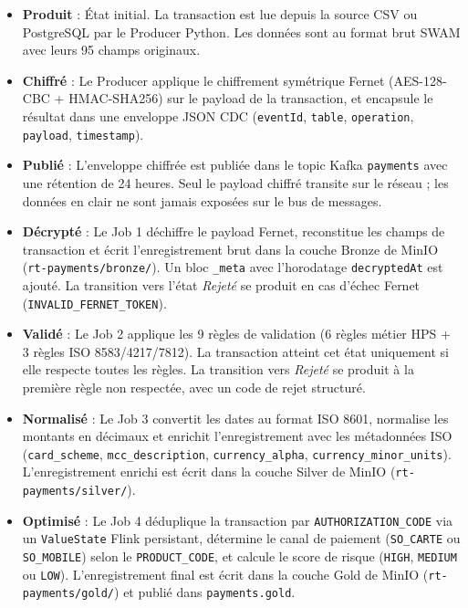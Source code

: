 \begin{itemize}[leftmargin=1.5cm]
    \item \textbf{Produit} : État initial. La transaction est lue depuis la source CSV ou PostgreSQL par le Producer Python. Les données sont au format brut SWAM avec leurs 95 champs originaux.

    \item \textbf{Chiffré} : Le Producer applique le chiffrement symétrique Fernet (AES-128-CBC + HMAC-SHA256) sur le payload de la transaction, et encapsule le résultat dans une enveloppe JSON CDC (\texttt{eventId}, \texttt{table}, \texttt{operation}, \texttt{payload}, \texttt{timestamp}).

    \item \textbf{Publié} : L'enveloppe chiffrée est publiée dans le topic Kafka \texttt{payments} avec une rétention de 24 heures. Seul le payload chiffré transite sur le réseau ; les données en clair ne sont jamais exposées sur le bus de messages.

    \item \textbf{Décrypté} : Le Job 1 déchiffre le payload Fernet, reconstitue les champs de transaction et écrit l'enregistrement brut dans la couche Bronze de MinIO (\texttt{rt-payments/bronze/}). Un bloc \texttt{\_meta} avec l'horodatage \texttt{decryptedAt} est ajouté. La transition vers l'état \textit{Rejeté} se produit en cas d'échec Fernet (\texttt{INVALID\_FERNET\_TOKEN}).

    \item \textbf{Validé} : Le Job 2 applique les 9 règles de validation (6 règles métier HPS + 3 règles ISO 8583/4217/7812). La transaction atteint cet état uniquement si elle respecte toutes les règles. La transition vers \textit{Rejeté} se produit à la première règle non respectée, avec un code de rejet structuré.

    \item \textbf{Normalisé} : Le Job 3 convertit les dates au format ISO 8601, normalise les montants en décimaux et enrichit l'enregistrement avec les métadonnées ISO (\texttt{card\_scheme}, \texttt{mcc\_description}, \texttt{currency\_alpha}, \texttt{currency\_minor\_units}). L'enregistrement enrichi est écrit dans la couche Silver de MinIO (\texttt{rt-payments/silver/}).

    \item \textbf{Optimisé} : Le Job 4 déduplique la transaction par \texttt{AUTHORIZATION\_CODE} via un \texttt{ValueState} Flink persistant, détermine le canal de paiement (\texttt{SO\_CARTE} ou \texttt{SO\_MOBILE}) selon le \texttt{PRODUCT\_CODE}, et calcule le score de risque (\texttt{HIGH}, \texttt{MEDIUM} ou \texttt{LOW}). L'enregistrement final est écrit dans la couche Gold de MinIO (\texttt{rt-payments/gold/}) et publié dans \texttt{payments.gold}.


\end{itemize}
